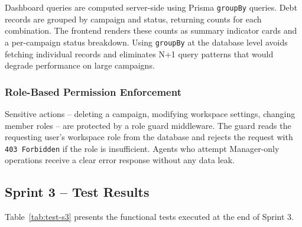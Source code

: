\documentclass[12pt,a4paper]{report}
\begin{document}
Dashboard queries are computed server-side using Prisma \texttt{groupBy} queries.
Debt records are grouped by campaign and status, returning counts for each combination.
The frontend renders these counts as summary indicator cards and a per-campaign
status breakdown.
Using \texttt{groupBy} at the database level avoids fetching individual records and
eliminates N+1 query patterns that would degrade performance on large campaigns.

\subsubsection{Role-Based Permission Enforcement}

Sensitive actions -- deleting a campaign, modifying workspace settings, changing
member roles -- are protected by a role guard middleware.
The guard reads the requesting user's workspace role from the database and rejects
the request with \texttt{403 Forbidden} if the role is insufficient.
Agents who attempt Manager-only operations receive a clear error response without
any data leak.

\subsection{Sprint 3 -- Test Results}

Table~\ref{tab:test-s3} presents the functional tests executed at the end of Sprint 3.
\end{document}
